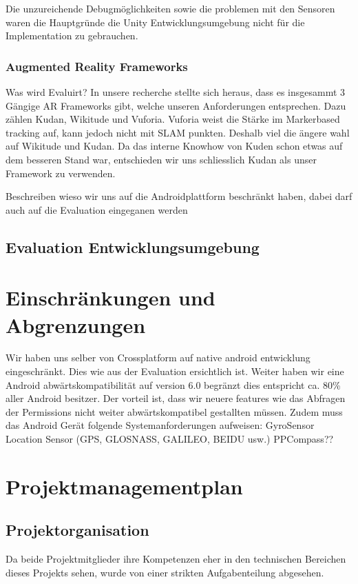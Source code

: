 \documentclass[a4paper]{scrreprt}
\begin{document}
Die unzureichende Debugmöglichkeiten sowie die problemen mit den Sensoren waren die Hauptgründe die Unity Entwicklungsumgebung nicht für die Implementation zu gebrauchen.

\subsubsection{Augmented Reality Frameworks}
Was wird Evaluirt?
In unsere recherche stellte sich heraus, dass es insgesammt 3 Gängige AR Frameworks gibt, welche unseren Anforderungen entsprechen.
Dazu zählen Kudan, Wikitude und Vuforia.
Vuforia weist die Stärke im Markerbased tracking auf, kann jedoch nicht mit SLAM punkten. Deshalb viel die ängere wahl auf Wikitude und Kudan. Da das interne Knowhow von Kuden schon etwas auf dem besseren Stand war, entschieden wir uns schliesslich Kudan als unser Framework zu verwenden.


Beschreiben wieso wir uns auf die Androidplattform beschränkt haben, dabei darf auch auf die Evaluation eingeganen werden


\subsection{Evaluation Entwicklungsumgebung}

\section{Einschränkungen und Abgrenzungen}
Wir haben uns selber von Crossplatform auf native android entwicklung eingeschränkt. Dies wie aus der Evaluation ersichtlich ist.
Weiter haben wir eine Android abwärtskompatibilität auf version 6.0 begränzt dies entspricht ca. 80\% aller Android besitzer. Der vorteil ist, dass wir neuere features wie das Abfragen der Permissions nicht weiter abwärtskompatibel gestallten müssen.
Zudem muss das Android Gerät folgende Systemanforderungen aufweisen:
	GyroSensor
	Location Sensor (GPS, GLOSNASS, GALILEO, BEIDU usw.)
	PPCompass??


\section{Projektmanagementplan}

\subsection{Projektorganisation}
Da beide Projektmitglieder ihre Kompetenzen eher in den technischen Bereichen dieses Projekts sehen, wurde von einer strikten Aufgabenteilung abgesehen.
\end{document}
